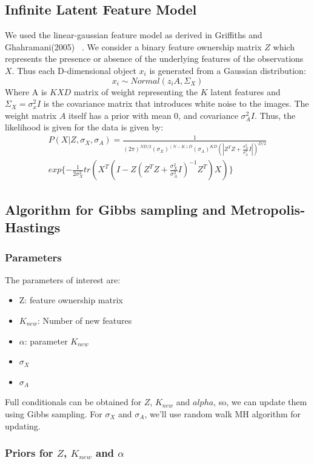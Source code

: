 \documentclass{article}
\begin{document}
\subsection{Infinite Latent Feature Model}
We used the linear-gaussian feature model as derived in Griffiths and Ghahramani(2005) ~\cite{griffiths}. We consider a binary feature ownership matrix $Z$ which represents the presence or absence of the underlying features of the observations $X$. Thus each D-dimensional object $x_i$ is generated from a Gaussian distribution:
\[
x_i \sim Normal(z_iA, \Sigma_X)
\]
Where A is $KXD$ matrix of weight representing the $K$ latent features and $\Sigma_X= \sigma^2_xI$ is the covariance matrix that introduces white noise to the images. The weight matrix $A$ itself has a prior with mean 0, and covariance $\sigma^2_AI$. Thus, the likelihood is given for the data is given by:
\begin{multline}\label{eq:lik}
P(X|Z,\sigma_X, \sigma_A) = \frac{1}{(2 \pi)^{ND/2} (\sigma_X)^{(N-K)D}(\sigma_A)^{KD}(|Z^TZ+\frac{\sigma_X^2}{\sigma_A^2}I|)^{D/2}}\\
exp\{-\frac{1}{2\sigma_X^2}tr(X^T(I-Z(Z^TZ+\frac{\sigma_X^2}{\sigma_A^2}I)^{-1}Z^T)X)\}
\end{multline}


\subsection{Algorithm for Gibbs sampling and Metropolis-Hastings}

\subsubsection{Parameters}
The parameters of interest are:
\begin{itemize}
\item{Z: feature ownership matrix}
\item{$K_{new}$: Number of new features}
\item{$\alpha$: parameter $K_{new}$}
\item{$\sigma_X$}
\item{$\sigma_A$}
\end{itemize}

Full conditionals can be obtained for $Z$, $K_{new}$ and $alpha$, so, we can update them using Gibbs sampling. For $\sigma_X$ and $\sigma_A$, we'll use random walk MH algorithm for updating.\\
\subsubsection{Priors for $Z$, $K_{new}$ and $\alpha$}
\end{document}
